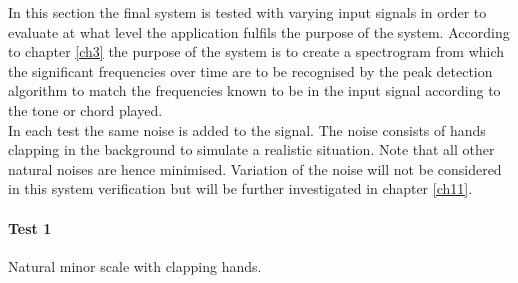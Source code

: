 In this section the final system is tested with varying input signals in order to evaluate at what level the application fulfils the purpose of the system. According to chapter \ref{ch3} the purpose of the system is to create a spectrogram from which the significant frequencies over time are to be recognised by the peak detection algorithm to match the frequencies known to be in the input signal according to the tone or chord played. \\
In each test the same noise is added to the signal. The noise consists of hands clapping in the background to simulate a realistic situation. Note that all other natural noises are hence minimised. Variation of the noise will not be considered in this system verification but will be further investigated in chapter \ref{ch11}.

\paragraph{Test 1} Natural minor scale with clapping hands.
